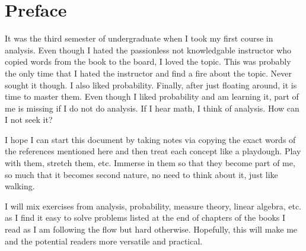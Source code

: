 \chapter*{Preface}
\label{chap:Preface}
%

It was the third semester of undergraduate 
when I took my first course in analysis. Even though
I hated the passionless not knowledgable instructor
who copied words from the book to the board, I loved
the topic. This was probably the only time that I hated
the instructor and find a fire about the topic. Never
sought it though. I also liked probability. Finally, after
just floating around, it is time to master them. Even though
I liked probability and am learning it, part of me is missing
if I do not do analysis. If I hear math, I think of analysis. How
can I not seek it?

I hope I can start this document by taking notes via copying the 
exact words of the references mentioned here and
then treat each concept like a playdough. 
Play with them, stretch them, etc. Immerse in them
so that they become part of me, so much that it becomes second nature, 
no need to think about it, just like walking.

I will mix exercises from analysis, probability, measure theory,
linear algebra, etc. as I find it easy to solve problems listed at the end of
chapters of the books I read as I am following the flow but hard
otherwise. Hopefully, this will make me and the potential readers
more versatile and practical.



